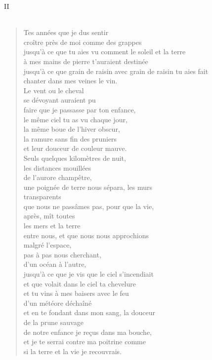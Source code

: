 \documentclass[11pt,a4paper]{book}
\begin{document}
\newpage

{\huge II} \\ \\

\begin{verse}
Tes années que je dus sentir \\
croître près de moi comme des grappes \\
jusqu'à ce que tu aies vu comment le soleil et la terre \\
à mes mains de pierre t'auraient destinée \\
jusqu'à ce que grain de raisin avec grain de raisin tu aies fait \\
chanter dans mes veines le vin. \\
Le vent ou le cheval \\
se dévoyant auraient pu \\
faire que je passasse par ton enfance, \\
le même ciel tu as vu chaque jour, \\
la même boue de l'hiver obscur, \\
la ramure sans fin des pruniers \\
et leur douceur de couleur mauve. \\
Seuls quelques kilomètres de nuit, \\
les distances mouillées \\
de l'aurore champêtre, \\
une poignée de terre nous sépara, les murs \\
transparents \\
que nous ne passâmes pas, pour que la vie, \\
après, mît toutes \\
les mers et la terre \\
entre nous, et que nous nous approchions \\
malgré l'espace, \\
pas à pas nous cherchant, \\
d'un océan à l'autre, \\
jusqu'à ce que je vis que le ciel s'incendiait \\
et que volait dans le ciel ta chevelure \\
et tu vins à mes baisers avec le feu \\
d'un météore déchaîné \\
et en te fondant dans mon sang, la douceur \\
de la prune sauvage \\
de notre enfance je re\c{c}us dans ma bouche, \\
et je te serrai contre ma poitrine comme \\
si la terre et la vie je recouvrais.
\end{verse}
\end{document}
